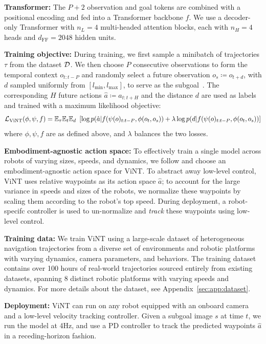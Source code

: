 \documentclass{article}
\newcommand{\ModelName}{ViNT\xspace}
\newcommand{\MyPara}[1]{\noindent\textbf{#1}}
\begin{document}
\MyPara{Transformer:} The $P+2$ observation and goal tokens are combined with a positional encoding and fed into a Transformer backbone $f$. We use a decoder-only Transformer with $n_L=4$ multi-headed attention blocks, each with $n_H=4$ heads and $d_\text{FF}=2048$ hidden units.

\MyPara{Training objective:}
During training, we first sample a minibatch of trajectories $\tau$ from the dataset ${\mathcal{D}}$. We then choose $P$ consecutive observations to form the temporal context $o_{t:t-P}$ and randomly select a future observation $o_s \coloneqq o_{t+d}$, with $d$ sampled uniformly from $[l_\text{min}, l_\text{max}]$, to serve as the subgoal~\cite{hartikainen2020}. The corresponding $H$ future actions $\hat{a}\coloneqq a_{t:t+H}$ and the distance $d$ are used as labels and trained with a maximum likelihood objective:
\begin{equation}
    \gL_\text{\ModelName}(\phi, \psi, f) = \mathbb{E}_{\tau} {\mathbb{E}}_t {\mathbb{E}}_d \,\, \left[\log p(\hat{a} | f(\psi(o)_{t:t-P}, \phi(o_t,o_s)) + \lambda \log p(d | f(\psi(o)_{t:t-P}, \phi(o_t,o_s))\right]
    \label{eq:training_objective}
\end{equation}
where $\phi,\psi,f$ are as defined above, and $\lambda$ balances the two losses.

\MyPara{Embodiment-agnostic action space:} To effectively train a single model across robots of varying sizes, speeds, and dynamics, we follow \citet{shah2022gnm} and choose an embodiment-agnostic action space for \ModelName. To abstract away low-level control, \ModelName uses relative waypoints as its action space $\hat{a}$; to account for the large variance in speeds and sizes of the robots, we normalize these waypoints by scaling them according to the robot's top speed. During deployment, a robot-specifc controller is used to un-normalize and \emph{track} these waypoints using low-level control.

\MyPara{Training data:} We train \ModelName using a large-scale dataset of heterogeneous navigation trajectories from a diverse set of environments and robotic platforms with varying dynamics, camera parameters, and behaviors. The training dataset contains over 100 hours of real-world trajectories sourced entirely from existing datasets, spanning 8 distinct robotic platforms with varying speeds and dynamics. For more details about the dataset, see Appendix~\ref{sec:app:dataset}.

\MyPara{Deployment:} \ModelName can run on any robot equipped with an onboard camera and a low-level velocity tracking controller.
Given a subgoal image $s$ at time $t$, we run the model at 4Hz, and use a PD controller to track the predicted waypoints $\hat{a}$ in a receding-horizon fashion.
\end{document}
